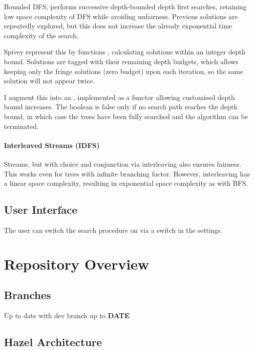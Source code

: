 Bounded DFS, performs successive depth-bounded depth first searches, retaining low space complexity of DFS while avoiding unfairness. Previous solutions are repeatedly explored, but this does not increase the already exponential time complexity of the search.

Spivey \cite{Bunches} represent this by functions , calculating solutions within an integer depth bound. Solutions are tagged with their remaining depth budgets, which allows keeping only the fringe solutions (zero budget) upon each iteration, so the same solution will not appear twice.

I augment this into an , implemented as a functor allowing customised depth bound increases. The boolean is false only if no search path reaches the depth bound, in which case the trees have been fully searched and the algorithm can be terminated.


\paragraph{Interleaved Streams (IDFS)}
Streams, but with choice and conjunction via interleaving also ensures fairness. This works even for trees with infinite branching factor. However, interleaving has a linear space complexity, resulting in exponential space complexity as with BFS.

\subsection{User Interface}
The user can switch the search procedure on via a switch in the settings.

\section{Repository Overview}
\subsection{Branches}
Up to date with dev branch up to \textbf{DATE}

\subsection{Hazel Architecture}



